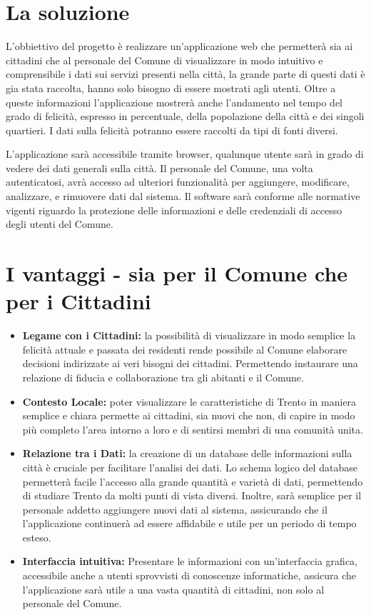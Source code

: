 \section{La soluzione}
    L'obbiettivo del progetto è realizzare un'applicazione web che permetterà sia ai cittadini che al personale del Comune di visualizzare in modo intuitivo e comprensibile i dati sui servizi presenti nella città, la grande parte di questi dati è gia stata raccolta, hanno solo bisogno di essere mostrati agli utenti. Oltre a queste informazioni l'applicazione mostrerà anche l'andamento nel tempo del grado di felicità, espresso in percentuale, della popolazione della città e dei singoli quartieri. I dati sulla felicità potranno essere raccolti da tipi di fonti diversi.

    L'applicazione sarà accessibile tramite browser, qualunque utente sarà in grado di vedere dei dati generali sulla città. Il personale del Comune, una volta autenticatosi, avrà accesso ad ulteriori funzionalità per aggiungere, modificare, analizzare, e rimuovere dati dal sistema. Il software sarà conforme alle normative vigenti riguardo la protezione delle informazioni e delle credenziali di accesso degli utenti del Comune.


\section{I vantaggi - sia per il Comune che per i Cittadini}
    \begin{itemize}
        \item \textbf{Legame con i Cittadini:} la possibilità di visualizzare in modo semplice la felicità attuale e passata dei residenti rende possibile al Comune elaborare decisioni indirizzate ai veri bisogni dei cittadini. Permettendo instaurare una relazione di fiducia e collaborazione tra gli abitanti e il Comune.
        \item \textbf{Contesto Locale:} poter visualizzare le caratteristiche di Trento in maniera semplice e chiara permette ai cittadini, sia nuovi che non, di capire in modo più completo l'area intorno a loro e di sentirsi membri di una comunità unita.
        \item \textbf{Relazione tra i Dati:} la creazione di un database delle informazioni sulla città è cruciale per facilitare l'analisi dei dati. Lo schema logico del database permetterà facile l'accesso alla grande quantità e varietà di dati, permettendo di studiare Trento da molti punti di vista diversi. Inoltre, sarà semplice per il personale addetto aggiungere nuovi dati al sistema, assicurando che il l'applicazione continuerà ad essere affidabile e utile per un periodo di tempo esteso.
        \item \textbf{Interfaccia intuitiva:} Presentare le informazioni con un'interfaccia grafica, accessibile anche a utenti sprovvisti di conoscenze informatiche, assicura che l'applicazione sarà utile a una vasta quantità di cittadini, non solo al personale del Comune.
    \end{itemize}